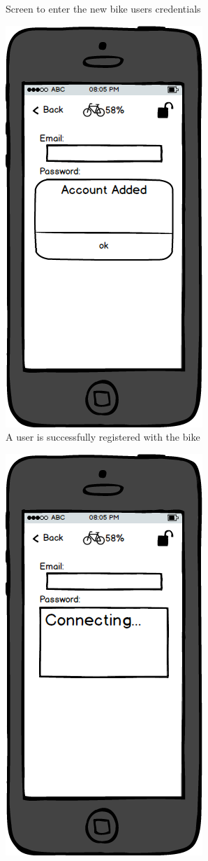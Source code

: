 \documentclass[a4paper]{report}
\begin{document}
{\begin{figure}
\caption{Screen to enter the new bike users credentials}
\end{figure}
\clearpage\begin{figure}
\centering
\includegraphics[scale=0.9]{figures/prototype_2/account_added}
\caption{A user is successfully registered with the bike}
\end{figure}
\clearpage
\begin{figure}
\centering
\includegraphics[scale=0.9]{figures/prototype_2/add_user_conn}

\end{figure}}
\end{document}
